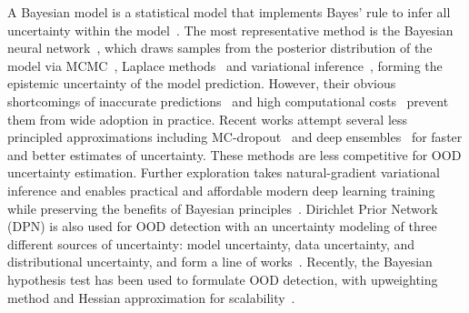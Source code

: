 \label{sec:ood_bayesian}
A Bayesian model is a statistical model that implements Bayes' rule to infer all uncertainty within the model~.
The most representative method is the Bayesian neural network~, which draws samples from the posterior distribution of the model via MCMC~, Laplace methods~ and variational inference~, forming the epistemic uncertainty of the model prediction.
However, their obvious shortcomings of inaccurate predictions~ and high computational costs~ prevent them from wide adoption in practice.
Recent works attempt several less principled approximations including MC-dropout~ and deep ensembles~ for faster and better estimates of uncertainty. These methods are less competitive for OOD uncertainty estimation. 
Further exploration takes natural-gradient variational inference and enables practical and affordable modern deep learning training while preserving the benefits of Bayesian principles~.
Dirichlet Prior Network (DPN) is also used for OOD detection with an uncertainty modeling of three different sources of uncertainty: model uncertainty, data uncertainty, and distributional uncertainty, and form a line of works~.
Recently, the Bayesian hypothesis test has been used to formulate OOD detection, with upweighting method and Hessian approximation for scalability~.

